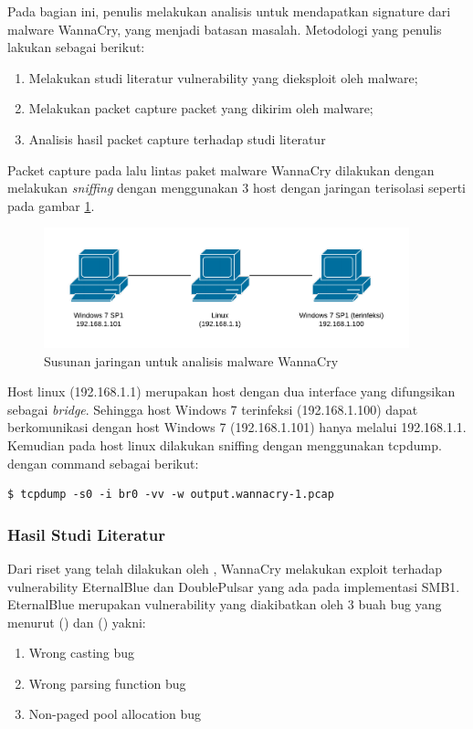 Pada bagian ini, penulis melakukan analisis untuk mendapatkan signature dari malware WannaCry, yang menjadi batasan masalah. Metodologi yang penulis lakukan sebagai berikut:

\begin{enumerate}
	\item {Melakukan studi literatur vulnerability yang dieksploit oleh malware;}
	\item {Melakukan packet capture packet yang dikirim oleh malware;}
	\item {Analisis hasil packet capture terhadap studi literatur}
\end{enumerate}

Packet capture pada lalu lintas paket malware WannaCry dilakukan dengan melakukan \textit{sniffing} dengan menggunakan 3 host dengan jaringan terisolasi seperti pada gambar \ref{fig:analisis_malware_net}.

\begin{figure}[H]
	\centering
	\includegraphics[width=400px]{resources/analisis_malware_net.png}
	\caption{Susunan jaringan untuk analisis malware WannaCry}
	\label{fig:analisis_malware_net}
\end{figure}

Host linux (192.168.1.1) merupakan host dengan dua interface yang difungsikan sebagai \textit{bridge}. Sehingga host Windows 7 terinfeksi (192.168.1.100) dapat berkomunikasi dengan host Windows 7 (192.168.1.101) hanya melalui 192.168.1.1. Kemudian pada host linux dilakukan sniffing dengan menggunakan tcpdump. dengan command sebagai berikut:

\begin{verbatim}
$ tcpdump -s0 -i br0 -vv -w output.wannacry-1.pcap
\end{verbatim}

\subsubsection{Hasil Studi Literatur}

Dari riset yang telah dilakukan oleh \cite{islam2018smb}, WannaCry melakukan exploit terhadap vulnerability EternalBlue dan DoublePulsar yang ada pada implementasi SMB1. EternalBlue merupakan vulnerability yang diakibatkan oleh 3 buah bug yang menurut (\cite{islam2018smb}) dan (\cite{grossman2017check}) yakni:
\begin{enumerate}
	\item Wrong casting bug
	\item Wrong parsing function bug
	\item Non-paged pool allocation bug
\end{enumerate}

